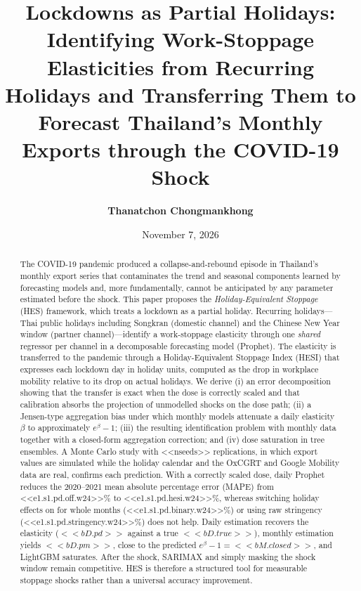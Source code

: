 \documentclass{article}
\title{Lockdowns as Partial Holidays:\\ Identifying Work-Stoppage Elasticities from Recurring Holidays and Transferring Them to Forecast Thailand's Monthly Exports through the COVID-19 Shock}
\author{\textbf{Thanatchon Chongmankhong}}
\date{November 7, 2026}
\theoremstyle{plain}
\theoremstyle{definition}
\theoremstyle{remark}
\begin{document}
\maketitle



\begin{abstract}
\noindent The COVID-19 pandemic produced a collapse-and-rebound episode in Thailand's monthly export series that contaminates the trend and seasonal components learned by forecasting models and, more fundamentally, cannot be anticipated by any parameter estimated before the shock. This paper proposes the \emph{Holiday-Equivalent Stoppage} (HES) framework, which treats a lockdown as a partial holiday. Recurring holidays---Thai public holidays including Songkran (domestic channel) and the Chinese New Year window (partner channel)---identify a work-stoppage elasticity through one \emph{shared} regressor per channel in a decomposable forecasting model (Prophet). The elasticity is transferred to the pandemic through a Holiday-Equivalent Stoppage Index (HESI) that expresses each lockdown day in holiday units, computed as the drop in workplace mobility relative to its drop on actual holidays. We derive (i) an error decomposition showing that the transfer is exact when the dose is correctly scaled and that calibration absorbs the projection of unmodelled shocks on the dose path; (ii) a Jensen-type aggregation bias under which monthly models attenuate a daily elasticity $\beta$ to approximately $e^{\beta}-1$; (iii) the resulting identification problem with monthly data together with a closed-form aggregation correction; and (iv) dose saturation in tree ensembles. A Monte Carlo study with <<nseeds>> replications, in which export values are simulated while the holiday calendar and the OxCGRT and Google Mobility data are real, confirms each prediction. With a correctly scaled dose, daily Prophet reduces the 2020--2021 mean absolute percentage error (MAPE) from <<e1.s1.pd.off.w24>>\% to <<e1.s1.pd.hesi.w24>>\%, whereas switching holiday effects on for whole months (<<e1.s1.pd.binary.w24>>\%) or using raw stringency (<<e1.s1.pd.stringency.w24>>\%) does not help. Daily estimation recovers the elasticity ($<<bD.pd>>$ against a true $<<bD.true>>$), monthly estimation yields $<<bD.pm>>$, close to the predicted $e^{\beta}-1=<<bM.closed>>$, and LightGBM saturates. After the shock, SARIMAX and simply masking the shock window remain competitive. HES is therefore a structured tool for measurable stoppage shocks rather than a universal accuracy improvement.
\end{abstract}
\end{document}
